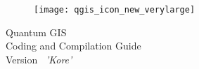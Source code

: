 
\begin{titlepage}
\begin{center}

\begin{figure}[H]
\begin{center}
\texttt{[image: qgis\_icon\_new\_verylarge]} 
\end{center}
\end{figure}

\Huge{Quantum GIS}\\
\vspace{0.5cm}
\Large{Coding and Compilation Guide} \\
\vspace{0.5cm}
\Large{Version ~\CURRENT \textsl{'Kore'}}

\end{center}
\end{titlepage}

